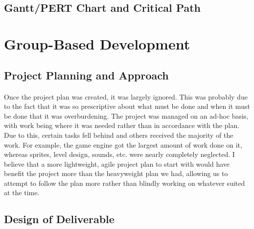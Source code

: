 \documentclass{article}
\begin{document}
\subsection{Gantt/PERT Chart and Critical Path}

\section {Group-Based Development}
\subsection {Project Planning and Approach}
\paragraph{} %
Once the project plan was created, it was largely ignored. This was probably due to the fact that it was so prescriptive about what must be done and when it must be done that it was overburdening. The project was managed on an ad-hoc basis, with work being where it was needed rather than in accordance with the plan. Due to this, certain tasks fell behind and others received the majority of the work. For example, the game engine got the largest amount of work done on it, whereas sprites, level design, sounds, etc. were nearly completely neglected. I believe that a more lightweight, agile project plan to start with would have benefit the project more than the heavyweight plan we had, allowing us to attempt to follow the plan more rather than blindly working on whatever suited at the time. 
\subsection {Design of Deliverable} %
\end{document}
